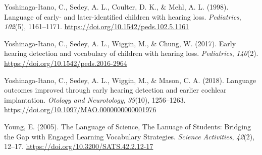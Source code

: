 \documentclass[
  english,
  man]{apa6}
\begin{document}
\leavevmode\hypertarget{ref-yoshinaga-itano1998}{}%
Yoshinaga-Itano, C., Sedey, A. L., Coulter, D. K., \& Mehl, A. L. (1998). Language of early- and later-identified children with hearing loss. \emph{Pediatrics}, \emph{102}(5), 1161--1171. \url{https://doi.org/10.1542/peds.102.5.1161}

\leavevmode\hypertarget{ref-yoshinaga-itano2017}{}%
Yoshinaga-Itano, C., Sedey, A. L., Wiggin, M., \& Chung, W. (2017). Early hearing detection and vocabulary of children with hearing loss. \emph{Pediatrics}, \emph{140}(2). \url{https://doi.org/10.1542/peds.2016-2964}

\leavevmode\hypertarget{ref-yoshinaga-itano2018}{}%
Yoshinaga-Itano, C., Sedey, A. L., Wiggin, M., \& Mason, C. A. (2018). Language outcomes improved through early hearing detection and earlier cochlear implantation. \emph{Otology and Neurotology}, \emph{39}(10), 1256--1263. \url{https://doi.org/10.1097/MAO.0000000000001976}

\leavevmode\hypertarget{ref-young2005}{}%
Young, E. (2005). The Language of Science, The Lanuage of Students: Bridging the Gap with Engaged Learning Vocabulary Strategies. \emph{Science Activities}, \emph{42}(2), 12--17. \url{https://doi.org/10.3200/SATS.42.2.12-17}
\end{document}
